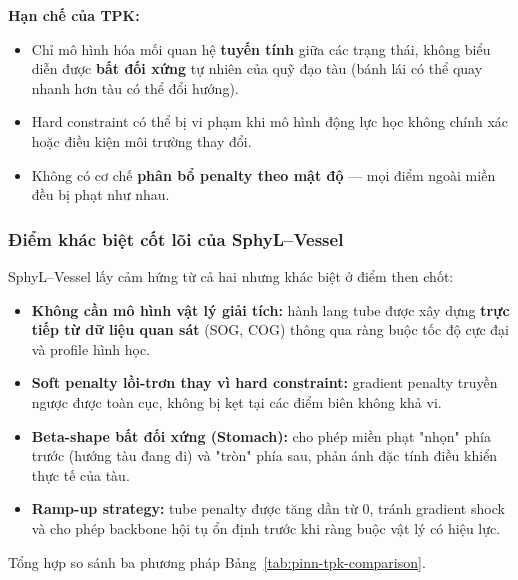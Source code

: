 \documentclass{IEEEtran}
\begin{document}
\textbf{Hạn chế của TPK:}
\begin{itemize}
  \item Chỉ mô hình hóa mối quan hệ \textbf{tuyến tính} giữa các trạng thái,
        không biểu diễn được \textbf{bất đối xứng} tự nhiên của quỹ đạo tàu
        (bánh lái có thể quay nhanh hơn tàu có thể đổi hướng).
  \item Hard constraint có thể bị vi phạm khi mô hình động lực học
        không chính xác hoặc điều kiện môi trường thay đổi.
  \item Không có cơ chế \textbf{phân bổ penalty theo mật độ} ---
        mọi điểm ngoài miền đều bị phạt như nhau.
\end{itemize}

\subsubsection{Điểm khác biệt cốt lõi của SphyL--Vessel}
SphyL--Vessel lấy cảm hứng từ cả hai nhưng khác biệt ở điểm then chốt:
\begin{itemize}
  \item \textbf{Không cần mô hình vật lý giải tích:}
        hành lang tube được xây dựng \textbf{trực tiếp từ dữ liệu quan sát}
        (SOG, COG) thông qua ràng buộc tốc độ cực đại và profile hình học.
  \item \textbf{Soft penalty lồi-trơn thay vì hard constraint:}
        gradient penalty truyền ngược được toàn cục,
        không bị kẹt tại các điểm biên không khả vi.
  \item \textbf{Beta-shape bất đối xứng (Stomach):}
        cho phép miền phạt "nhọn" phía trước (hướng tàu đang đi)
        và "tròn" phía sau, phản ánh đặc tính điều khiển thực tế của tàu.
  \item \textbf{Ramp-up strategy:}
        tube penalty được tăng dần từ 0, tránh gradient shock và
        cho phép backbone hội tụ ổn định trước khi ràng buộc vật lý
        có hiệu lực.
\end{itemize}

Tổng hợp so sánh ba phương pháp Bảng~\ref{tab:pinn-tpk-comparison}.
\end{document}
